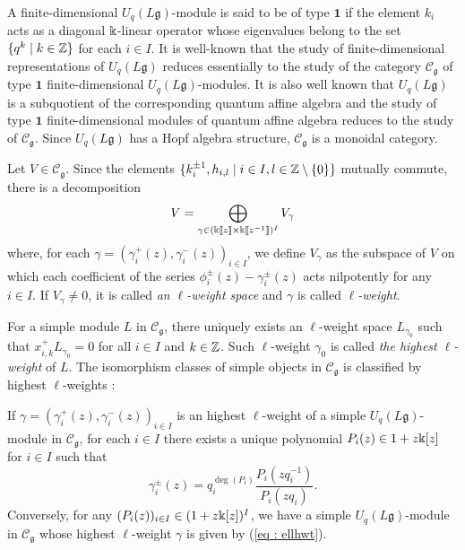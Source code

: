 A finite-dimensional $U_q(L\mathfrak{g})$-module is said to be of type
$\mathbf{1}$
if the element $k_i$ acts as a diagonal $\Bbbk$-linear operator
whose eigenvalues belong to the set $\{q^k \mid k \in \mathbb{Z}\}$
for each $i \in I$.
It is well-known that the study of finite-dimensional representations
of $U_q(L\mathfrak{g})$ reduces essentially to the study of the category
$\mathscr{C}_{\mathfrak{g}}$ of type $\mathbf{1}$ finite-dimensional
$U_q(L\mathfrak{g})$-modules.
It is also well known that $U_q(L\mathfrak{g})$ is a subquotient of the
corresponding
quantum affine algebra and the study of type $\mathbf{1}$
finite-dimensional modules of quantum affine algebra reduces
to the study of $\mathscr{C}_{\mathfrak{g}}$.
Since $U_q(L\mathfrak{g})$ has a Hopf algebra structure,
$\mathscr{C}_{\mathfrak{g}}$ is a monoidal category.

Let $V \in \mathscr{C}_{\mathfrak{g}}$.
Since the elements
$\{k_i^{\pm 1}, h_{i, l} \mid i \in I, l \in \mathbb{Z} \setminus \{0\}\}$
mutually commute, there is a decomposition
\[
V = \bigoplus_{\gamma \in
(\Bbbk[\![z]\!] \times \Bbbk[\![z^{-1}]\!])^I}V_{\gamma}
\]
where, for each
$\gamma = (\gamma_i^{+}(z), \gamma_i^{-}(z))_{i \in I}$,
we define $V_{\gamma}$ as the subspace of $V$ on which each coefficient
of the series $\phi_i^{\pm}(z) - \gamma_i^{\pm}(z)$ acts nilpotently
for any $i \in I$.
If $V_{\gamma} \neq 0$, it is called \emph{an $\ell$-weight space}
and $\gamma$ is called \emph{$\ell$-weight}.

For a simple module $L$ in $\mathscr{C}_{\mathfrak{g}}$,
there uniquely exists an $\ell$-weight space $L_{\gamma_0}$
such that $x_{i, k}^{+}L_{\gamma_0} = 0$
for all $i \in I$ and $k \in \mathbb{Z}$.
Such $\ell$-weight $\gamma_0$ is called
\emph{the highest $\ell$-weight} of $L$. 
The isomorphism classes of simple objects
in $\mathscr{C}_{\mathfrak{g}}$ is classified by highest $\ell$-weights :

\begin{Thm}
\label{Thm : Drinfeld poly}
If $\gamma = (\gamma_i^{+}(z), \gamma_i^{-}(z))_{i \in I}$
is an highest $\ell$-weight of a simple $U_q(L\mathfrak{g})$-module
in $\mathscr{C}_{\mathfrak{g}}$, for each $i \in I$ there exists a unique
polynomial
$P_i(z) \in 1 + z\Bbbk[z]$ for $i \in I$ such that
\begin{equation}
\label{eq : ellhwt}
\gamma_i^{\pm}(z) = q_i^{\deg(P_i)}
\frac{P_i(zq_i^{-1})}{P_i(zq_i)}.
\end{equation}
Conversely, for any $(P_i(z))_{i \in I} \in (1 + z\Bbbk[z])^I$,
we have a simple $U_q(L\mathfrak{g})$-module in $\mathscr{C}_{\mathfrak{g}}$
whose highest $\ell$-weight $\gamma$ is given by
{\rm (\ref{eq : ellhwt})}.
\end{Thm}

